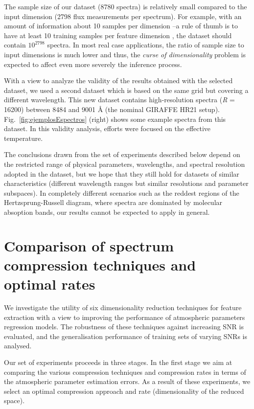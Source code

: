 \documentclass[a4paper,fleqn,usenatbib]{mnras}
\begin{document}
{{{The sample size of our dataset (8780 spectra) is relatively
small compared to the input dimension (2798 flux measurements 
per spectrum). For example, with an amount of 
information about 10 samples per dimension --a rule of thumb 
is to have at least 10 training samples per feature dimension 
\citep{jain:00}, the dataset should contain $10^{2798}$ spectra.
In most real case applications, the ratio of sample size to input 
dimensions is much lower and thus, the \textit{curse of dimensionality} 
problem is expected to affect even more severely the inference process. 

With a view to analyze the validity of the results obtained with the 
selected dataset, we used a second dataset which is based on the same 
grid but covering a different wavelength. This new dataset contains 
high-resolution spectra (\textit{R} = 16200) between 8484 and 9001 
{\AA} (the nominal GIRAFFE HR21 setup). 
Fig.~\ref{fig:ejemplosEspectros} (right) shows some example spectra from 
this dataset. In this validity analysis, efforts were focused on the 
effective temperature.

The conclusions drawn from the set of experiments described below
depend on the restricted range of physical parameters, wavelengths,
and spectral resolution adopted in the dataset, but we hope that they
still hold for datasets of similar characteristics (different
wavelength ranges but similar resolutions and parameter subspaces). In
completely different scenarios such as the reddest regions of the
Hertzsprung-Russell diagram, where spectra are dominated by molecular
absoption bands, our results cannot be expected to apply in general.

\section{Comparison of spectrum compression techniques and optimal rates}
\label{sec:comparison1}

We investigate the utility of six dimensionality reduction techniques
for feature extraction with a view to improving the performance of
atmospheric parameters regression models. The robustness of these
techniques against increasing SNR is evaluated, and the generalisation
performance of training sets of varying SNRs is analysed.

Our set of experiments proceeds in three stages. In the first stage we
aim at comparing the various compression techniques and compression
rates in terms of the atmospheric parameter estimation errors. As a
result of these experiments, we select an optimal compression approach
and rate (dimensionality of the reduced space).

}}}
\end{document}
